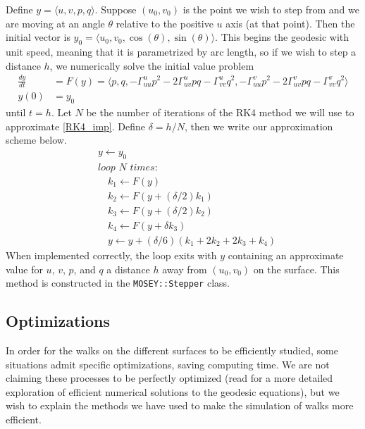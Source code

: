 \documentclass{article}
\begin{document}
	Define $y = \langle u , v , p , q \rangle$.
	Suppose $(u_0,v_0)$ is the point we wish to step from and we are moving at an angle $\theta$ relative to the positive $u$ axis (at that point).
	Then the initial vector is $y_0 = \langle u_0 , v_0 , \cos(\theta) , \sin(\theta) \rangle$.
	This begins the geodesic with unit speed, meaning that it is parametrized by arc length, so if we wish to step a distance $h$, we numerically solve the initial value problem
	\begin{equation} \label{RK4_imp} \begin{split}
		\frac{dy}{dt} & = F(y) = \langle p , q , -\Gamma^u_{uu}p^2-2\Gamma^u_{uv}pq-\Gamma^u_{vv}q^2 , -\Gamma^v_{uu}p^2-2\Gamma^v_{uv}pq-\Gamma^v_{vv}q^2 \rangle \\
		y(0) & = y_0
	\end{split} \end{equation}
	until $t = h$.
	Let $N$ be the number of iterations of the RK4 method we will use to approximate \ref{RK4_imp}.
	Define $\delta = h/N$, then we write our approximation scheme below.
	\begin{equation} \label{RK4_alg} \begin{split}
		& y \gets y_0 \\
		& \textit{loop } N \textit{ times:} \\
		& \quad k_1 \gets F(y) \\
		& \quad k_2 \gets F\left(y+(\delta/2)k_1\right) \\
		& \quad k_3 \gets F\left(y+(\delta/2)k_2\right) \\
		& \quad k_4 \gets F\left(y + \delta k_3\right) \\
		& \quad y \gets y+(\delta/6)(k_1+2k_2+2k_3+k_4)
	\end{split} \end{equation}
	When implemented correctly, the loop exits with $y$ containing an approximate value for $u$, $v$, $p$, and $q$ a distance $h$ away from $(u_0, v_0)$ on the surface.
	This method is constructed in the \texttt{MOSEY::Stepper} class.
	
	\subsection{Optimizations}
	In order for the walks on the different surfaces to be efficiently studied, some situations admit specific optimizations, saving computing time.
	We are not claiming these processes to be perfectly optimized (read \cite{Redfield_NumericalGeodesics_2007} for a more detailed exploration of efficient numerical solutions to the geodesic equations), but we wish to explain the methods we have used to make the simulation of walks more efficient.
	
\end{document}
